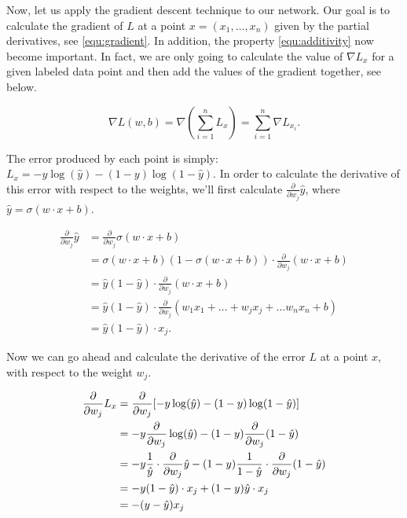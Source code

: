 Now, let us apply the gradient descent technique to our network. Our goal is to calculate the gradient of $L$ at a point $x = (x_1, \ldots, x_n)$ given by the partial derivatives, see \cref{equ:gradient}. In addition, the property \cref{equ:additivity} now become important. In fact, we are only going to calculate the value of $\nabla L_x$ for a given labeled data point and then add the values of the gradient together, see below.

\begin{equation}
  \nabla L(w, b) = \nabla (\sum_{i = 1}^{n} L_x) = \sum_{i = 1}^{n} \nabla L_{x_i}.
\end{equation}

The error produced by each point is simply: $ L_x = -y \log (\hat{y}) - (1 - y) \log (1 - \hat{y})$. In order to calculate the derivative of this error with respect to the weights, we'll first calculate $ \frac{\partial}{\partial w_j} \hat{y}$, where $ \hat{y} = \sigma (w \cdot x + b)$.

\begin{align*}
  \frac{\partial}{\partial w_j} \hat{y} &= \frac{\partial}{\partial w_j} \sigma (w \cdot x + b) \\
     &= \sigma (w \cdot x + b) (1 - \sigma (w \cdot x + b)) \cdot \frac{\partial}{\partial w_j} (w \cdot x + b) \\
     &= \hat{y} (1 - \hat{y}) \cdot \frac{\partial}{\partial w_j} (w \cdot x + b) \\
     &= \hat{y} (1 - \hat{y}) \cdot \frac{\partial}{\partial w_j} (w_1 x_1 + \ldots + w_j x_j + \ldots w_n x_n + b) \\
     &= \hat{y} (1 - \hat{y}) \cdot x_j.
\end{align*}

Now we can go ahead and calculate the derivative of the error $L$ at a point $x$, with respect to the weight $w_j$.

\begin{align*}
  \frac{\partial}{\partial w_j} L_x &= \frac{\partial}{\partial w_j} [-y \log (\hat{y}) - (1 - y) \log (1 - \hat{y})] \\
     &= -y \frac{\partial}{\partial w_j} \log (\hat{y}) - (1 - y) \frac{\partial}{\partial w_j} (1 - \hat{y}) \\
     &= -y \frac{1}{\hat{y}} \cdot \frac{\partial}{\partial w_j} \hat{y} - (1 - y) \frac{1}{1 - \hat{y}} \cdot \frac{\partial}{\partial w_j} (1 - \hat{y}) \\
     &= -y (1 - \hat{y}) \cdot x_j + (1 - y)\hat{y} \cdot x_j \\
     &= -(y - \hat{y}) x_j
\end{align*}

